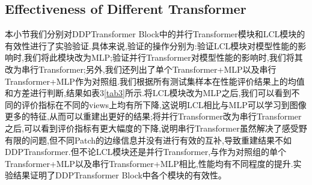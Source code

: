 \subsection{Effectiveness of Different Transformer}
本小节我们分别对DDPTransformer Block中的并行Transformer模块和LCL模块的有效性进行了实验验证.具体来说,验证的操作分别为:验证LCL模块对模型性能的影响时,我们将此模块改为MLP;验证并行Transformer对模型性能的影响时,我们将其改为串行Transformer;另外,我们还列出了单个Transformer+MLP以及串行Transformer+MLP作为对照组.我们根据所有测试集样本在性能评价结果上的均值和方差进行判断,结果如表3\ref{tab3}所示.将LCL模块改为MLP之后,我们可以看到不同的评价指标在不同的views上均有所下降,这说明LCL相比与MLP可以学习到图像更多的特征,从而可以重建出更好的结果;将并行Transformer改为串行Transformer之后,可以看到评价指标有更大幅度的下降,说明串行Transformer虽然解决了感受野有限的问题,但不同Patch的边缘信息并没有进行有效的互补,导致重建结果不如DDPTransformer.但不论LCL模块还是并行Transformer,与作为对照组的单个Transformer+MLP以及串行Transformer+MLP相比,性能均有不同程度的提升.实验结果证明了DDPTransformer Block中各个模块的有效性。\par
\begin{table}[H]
	\centering
	\caption{不同Transformer的性能结果 (均值$\pm$方差),最好的值用红色标出。}
	\label{tab3}
\end{table}

